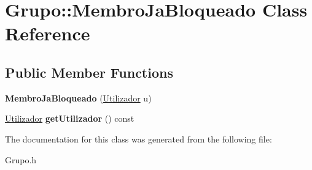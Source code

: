 \hypertarget{class_grupo_1_1_membro_ja_bloqueado}{}\section{Grupo\+:\+:Membro\+Ja\+Bloqueado Class Reference}
\label{class_grupo_1_1_membro_ja_bloqueado}
\subsection*{Public Member Functions}
\begin{DoxyCompactItemize}
\item 
\hypertarget{class_grupo_1_1_membro_ja_bloqueado_a4a20a1287cdeee327b118ac0aa2a4ece}{}{\bfseries Membro\+Ja\+Bloqueado} (\hyperlink{class_utilizador}{Utilizador} u)\label{class_grupo_1_1_membro_ja_bloqueado_a4a20a1287cdeee327b118ac0aa2a4ece}

\item 
\hypertarget{class_grupo_1_1_membro_ja_bloqueado_ac4cd51fd8a33eea935cfabeb2950a5cd}{}\hyperlink{class_utilizador}{Utilizador} {\bfseries get\+Utilizador} () const \label{class_grupo_1_1_membro_ja_bloqueado_ac4cd51fd8a33eea935cfabeb2950a5cd}

\end{DoxyCompactItemize}


The documentation for this class was generated from the following file\+:\begin{DoxyCompactItemize}
\item 
Grupo.\+h\end{DoxyCompactItemize}
